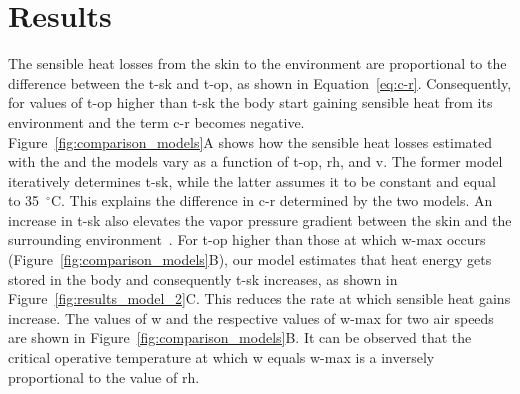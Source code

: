 

\section{Results}\label{sec:results}

The sensible heat losses from the skin to the environment are proportional to the difference between the \ac{t-sk} and \ac{t-op}, as shown in Equation~\ref{eq:c-r}.
Consequently, for values of \ac{t-op} higher than \ac{t-sk} the body start gaining sensible heat from its environment and the term \ac{c-r} becomes negative.
Figure~\ref{fig:comparison_models}A shows how the sensible heat losses estimated with the  and the  models vary as a function of \ac{t-op}, \ac{rh}, and \ac{v}.
The former model iteratively determines \ac{t-sk}, while the latter assumes it to be constant and equal to 35~$^{\circ}$C.
This explains the difference in \ac{c-r} determined by the two models.
An increase in \ac{t-sk} also elevates the vapor pressure gradient between the skin and the surrounding environment~\cite{VanSomeren2011}.
For \ac{t-op} higher than those at which \ac{w-max} occurs (Figure~\ref{fig:comparison_models}B), our model estimates that heat energy gets stored in the body and consequently \ac{t-sk} increases, as shown in Figure~\ref{fig:results_model_2}C\@.
This reduces the rate at which sensible heat gains increase.
The values of \ac{w} and the respective values of \ac{w-max} for two air speeds are shown in Figure~\ref{fig:comparison_models}B\@.
It can be observed that the critical operative temperature at which \ac{w} equals \ac{w-max} is a inversely proportional to the value of \ac{rh}.

